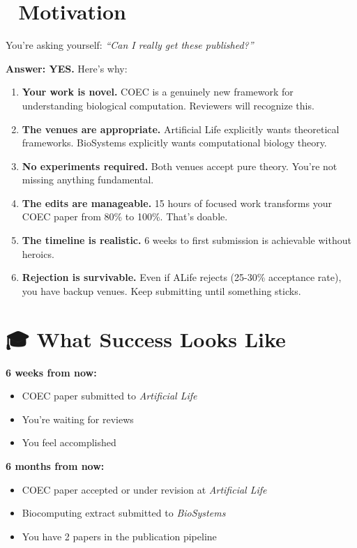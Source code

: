 \documentclass[11pt]{article}
\begin{document}
\section*{💪 Motivation}

You're asking yourself: \textit{``Can I really get these published?''}

\textbf{Answer: YES.} Here's why:

\begin{enumerate}
    \item \textbf{Your work is novel.} COEC is a genuinely new framework for understanding biological computation. Reviewers will recognize this.
    
    \item \textbf{The venues are appropriate.} Artificial Life explicitly wants theoretical frameworks. BioSystems explicitly wants computational biology theory.
    
    \item \textbf{No experiments required.} Both venues accept pure theory. You're not missing anything fundamental.
    
    \item \textbf{The edits are manageable.} 15 hours of focused work transforms your COEC paper from 80\% to 100\%. That's doable.
    
    \item \textbf{The timeline is realistic.} 6 weeks to first submission is achievable without heroics.
    
    \item \textbf{Rejection is survivable.} Even if ALife rejects (25-30\% acceptance rate), you have backup venues. Keep submitting until something sticks.
\end{enumerate}

\section*{🎓 What Success Looks Like}

\textbf{6 weeks from now:}
\begin{itemize}
    \item COEC paper submitted to \textit{Artificial Life}
    \item You're waiting for reviews
    \item You feel accomplished
\end{itemize}

\textbf{6 months from now:}
\begin{itemize}
    \item COEC paper accepted or under revision at \textit{Artificial Life}
    \item Biocomputing extract submitted to \textit{BioSystems}
    \item You have 2 papers in the publication pipeline
\end{itemize}
\end{document}
